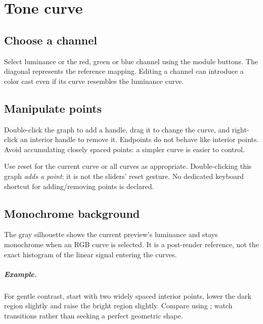 \chapter{Tone curve}
\section{Choose a channel}
Select luminance or the red, green or blue channel using the module buttons.
The diagonal represents the reference mapping. Editing a channel can introduce
a color cast even if its curve resembles the luminance curve.

\section{Manipulate points}
Double-click the graph to add a handle, drag it to change the curve, and
right-click an interior handle to remove it. Endpoints do not behave like
interior points. Avoid accumulating closely spaced points: a simpler curve
is easier to control.

Use reset for the current curve or all curves as appropriate. Double-clicking
this graph \emph{adds a point}: it is not the sliders' reset gesture.
No dedicated keyboard shortcut for adding/removing points is declared.

\section{Monochrome background}
The gray silhouette shows the current preview's luminance and stays monochrome
when an RGB curve is selected. It is a post-render reference, not the exact
histogram of the linear signal entering the curves.

\paragraph{Example.}
For gentle contrast, start with two widely spaced interior points, lower
the dark region slightly and raise the bright region slightly. Compare using
; watch transitions rather than seeking a perfect
geometric shape.
